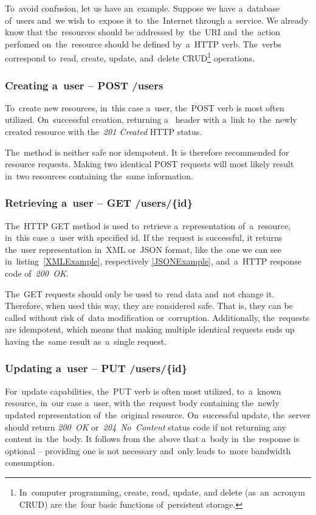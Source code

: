 To~avoid confusion, let us have an~example. Suppose we have a~database
of~users and~we wish to~expose it to~the~Internet through a~service.
We already know that the~resources should be addressed by~the~URI and~the~action
perfomed on~the~resource should be defined by~a~HTTP verb. The~verbs correspond
to~read, create, update, and~delete CRUD\footnote{In~computer programming,
create, read, update, and delete (as~an~acronym CRUD) are the~four basic
functions of~persistent storage.} operations.

\subsubsection{Creating a~user -- POST /users}
To~create new resources, in~this case a~user, the~POST verb is most often
utilized. On~successful creation, returning a~ header with a~link
to~the~newly created resource with the~\textit{201 Created} HTTP status.

The~method is neither safe nor idempotent. It is therefore recommended
for~ resource requests. Making two identical POST requests
will most likely result in~two resources containing the~same information.

\subsubsection{Retrieving a~user -- GET /users/\{id\}}
The~HTTP GET method is used to~retrieve a~representation of~a~resource, in~this
case a~user with specified id. If the~request is successful, it returns the~user
representation in~XML or~JSON format, like the~one we can see
in~listing~\ref{XMLExample}, respectively \ref{JSONExample},
and~a~HTTP response code of~\textit{200~OK}.

The~GET requests should only be used to~read data and~not change it. Therefore,
when used this way, they are considered safe. That is, they can be called
without risk of~data modification or~corruption. Additionally, the~requests are
idempotent, which means that making multiple identical requests ends up having
the~same result as~a~single request.

\subsubsection{Updating a~user -- PUT /users/\{id\}}
For~update capabilities, the~PUT verb is often most utilized, 
to~a~known resource, in~our case a~user, with the~request body containing
the~newly updated representation of~the~original resource. On~successful update,
the~server should return \textit{200~OK} or~\textit{204~No~Content} status code
if not returning any content in~the~body. It follows from the~above that a~body in~the~response
is optional -- providing one is not necessary and~only leads to~more
bandwidth consumption.

